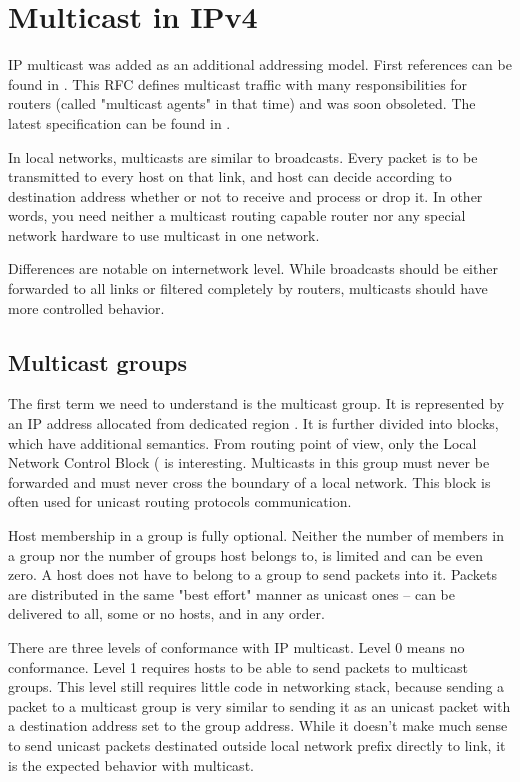 \chapter{Multicast in IPv4}

IP multicast was added as an additional addressing model. First
references can be found in . This RFC defines multicast traffic
with many responsibilities for routers (called "multicast agents" in that time)
and was soon obsoleted. The latest specification can be found in .

In local networks, multicasts are similar to broadcasts. Every packet is to be
transmitted to every host on that link, and host can decide according to
destination address whether or not to receive and process or drop it. In other
words, you need neither a multicast routing capable router nor any special
network hardware to use multicast in one network.

Differences are notable on internetwork level. While broadcasts should be
either forwarded to all links or filtered completely by routers, multicasts
should have more controlled behavior.

\section{Multicast groups}

The first term we need to understand is the multicast group. It is represented by an IP
address allocated from dedicated region . It is further
divided into blocks, which have additional semantics. From routing point of
view, only the Local Network Control Block ( is
interesting. Multicasts in this group must never be forwarded and must never
cross the boundary of a local network. This block is often used for unicast
routing protocols communication.

Host membership in a group is fully optional. Neither the number of members in
a group nor the number of groups host belongs to, is limited and can be even
zero. A host does not have to belong to a group to send packets into it.
Packets are distributed in the same "best effort" manner as unicast ones -- can
be delivered to all, some or no hosts, and in any order.

There are three levels of conformance with IP multicast. Level 0 means no
conformance. Level 1 requires hosts to be able to send packets to multicast
groups. This level still requires little code in networking stack, because
sending a packet to a multicast group is very similar to sending it as an unicast
packet with a destination address set to the group address. While it doesn't make much
sense to send unicast packets destinated outside local network prefix directly
to link, it is the expected behavior with multicast.

